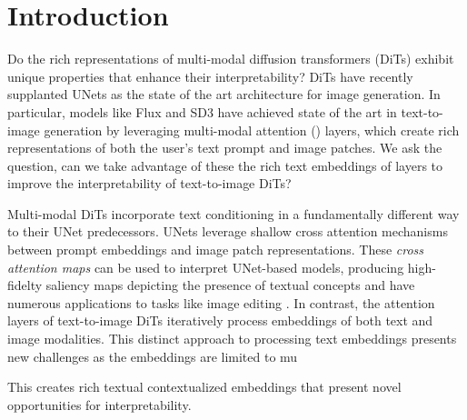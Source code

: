 
\section{Introduction}


Do the rich representations of multi-modal diffusion transformers (DiTs) exhibit unique properties that enhance their interpretability? 
DiTs \cite{peebles_scalable_2023} have recently supplanted UNets \cite{} as the state of the art architecture for image generation. In particular, models like Flux \cite{} and SD3 \cite{} have achieved state of the art in text-to-image generation by leveraging multi-modal attention (\layername) layers, which create rich representations of both the user's text prompt and image patches. We ask the question, can we take advantage of these the rich text embeddings of \layername layers to improve the interpretability of text-to-image DiTs? 

Multi-modal DiTs incorporate text conditioning in a fundamentally different way to their UNet predecessors. UNets leverage shallow cross attention mechanisms between prompt embeddings and image patch representations. These \textit{cross attention maps} can be used to interpret UNet-based models, producing high-fidelty saliency maps depicting the presence of textual concepts \cite{tang_what_2022} and have numerous applications to tasks like image editing \cite{hertz_prompt--prompt_2022, chefer_attend-and-excite_2023}. In contrast, the attention layers of text-to-image DiTs iteratively process embeddings of both text and image modalities. This distinct approach to processing text embeddings presents new challenges as the embeddings are limited to mu

This creates rich textual contextualized embeddings that present novel opportunities for interpretability. 

